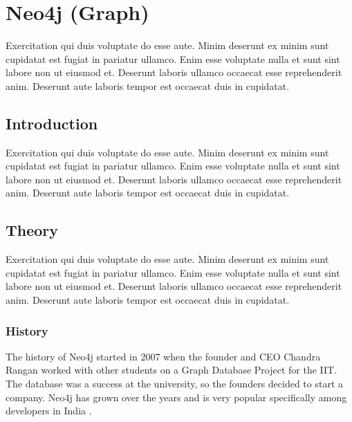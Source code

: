 
\chapter{Neo4j (Graph)} \label{ch:neo4j}

Exercitation qui duis voluptate do esse aute. Minim deserunt ex minim sunt cupidatat est fugiat in pariatur ullamco. Enim esse voluptate nulla et sunt sint labore non ut eiusmod et. Deserunt laboris ullamco occaecat esse reprehenderit anim. Deserunt aute laboris tempor est occaecat duis in cupidatat.

\section{Introduction} \label{sec:introductionNeo4j}

Exercitation qui duis voluptate do esse aute. Minim deserunt ex minim sunt cupidatat est fugiat in pariatur ullamco. Enim esse voluptate nulla et sunt sint labore non ut eiusmod et. Deserunt laboris ullamco occaecat esse reprehenderit anim. Deserunt aute laboris tempor est occaecat duis in cupidatat.

\section{Theory} \label{sec:theoryNeo4j}

Exercitation qui duis voluptate do esse aute. Minim deserunt ex minim sunt cupidatat est fugiat in pariatur ullamco. Enim esse voluptate nulla et sunt sint labore non ut eiusmod et. Deserunt laboris ullamco occaecat esse reprehenderit anim. Deserunt aute laboris tempor est occaecat duis in cupidatat.

\subsection{History} \label{subsec:historyNeo4j}

The history of Neo4j started in 2007 when the founder and CEO Chandra Rangan worked with other students on a Graph Database Project for the \ac{IIT}. The database was a success at the university, so the founders
decided to start a company. Neo4j has grown over the years and is very popular specifically among developers in India \parencite{historyneo4j}.

